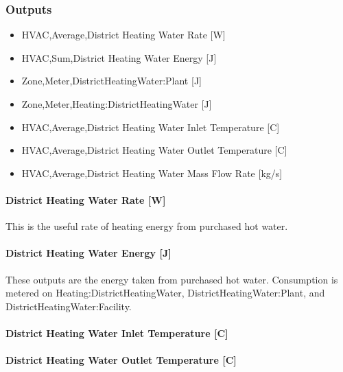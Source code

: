 \subsubsection{Outputs}\label{outputs-15-002}

\begin{itemize}
    \item
    HVAC,Average,District Heating Water Rate {[}W{]}
    \item
    HVAC,Sum,District Heating Water Energy {[}J{]}
    \item
    Zone,Meter,DistrictHeatingWater:Plant {[}J{]}
    \item
    Zone,Meter,Heating:DistrictHeatingWater {[}J{]}
    \item
    HVAC,Average,District Heating Water Inlet Temperature {[}C{]}
    \item
    HVAC,Average,District Heating Water Outlet Temperature {[}C{]}
    \item
    HVAC,Average,District Heating Water Mass Flow Rate {[}kg/s{]}
\end{itemize}

\paragraph{District Heating Water Rate {[}W{]}}\label{district-heating-hot-water-rate-w}

This is the useful rate of heating energy from purchased hot water.

\paragraph{District Heating Water Energy {[}J{]}}\label{district-heating-hot-water-energy-j}

These outputs are the energy taken from purchased hot water. Consumption is metered on Heating:DistrictHeatingWater, DistrictHeatingWater:Plant, and DistrictHeatingWater:Facility.

\paragraph{District Heating Water Inlet Temperature {[}C{]}}\label{district-heating-inlet-temperature-c}

\paragraph{District Heating Water Outlet Temperature {[}C{]}}\label{district-heating-outlet-temperature-c}

